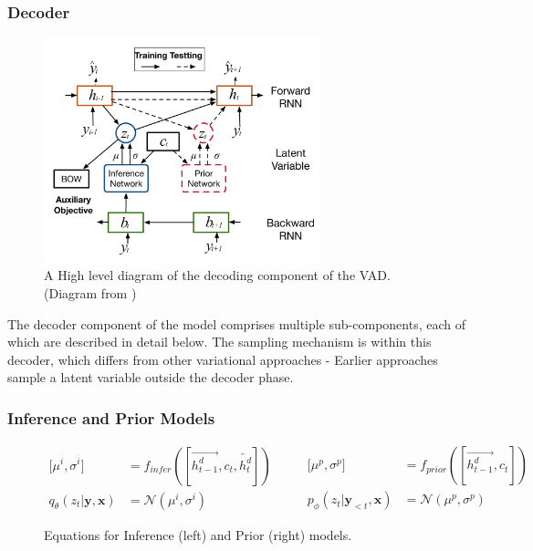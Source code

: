 \documentclass[12pt,twoside]{report}
\begin{document}
\subsubsection{Decoder}
\begin{figure}[!ht]
	\centering
	\includegraphics[width=80mm]{diagrams/vad_decoder.png}
	\caption{A High level diagram of the decoding component of the VAD. (Diagram from \cite{du_variational_2018})\label{r:vad_decoder}}
	\end{figure}
	
The decoder component of the model comprises multiple sub-components, each of which are described in detail below. The sampling mechanism is within this decoder, which differs from other variational approaches - Earlier approaches sample a latent variable outside the decoder phase.

\subsubsection{Inference and Prior Models}

\begin{figure}[!ht]
	\label{eqn:inf_prior}
	\begin{equation}
		\begin{split}
			\lbrack \mu^i, \sigma^i \rbrack &=
			f_{infer}([\overrightarrow{h^d_{t-1}}, c_t, \overleftarrow{h^d_t}])
			\\
			q_{\theta}(z_t|\boldsymbol{y}, \boldsymbol{x}) &= \mathcal{N}(\mu^i, \sigma^i)
		\end{split}
		\quad\quad
		\begin{split}
			\lbrack \mu^p, \sigma^p \rbrack &=
			f_{prior}([\overrightarrow{h^d_{t-1}}, c_t])
			\\
			p_{\phi}(z_t|\boldsymbol{y}_{<t}, \boldsymbol{x}) &= \mathcal{N}(\mu^p, \sigma^p)
		\end{split}
	\end{equation}
	\caption{Equations for Inference (left) and Prior (right) models.}
	\label{inf_prior}
	\end{figure}
\end{document}
